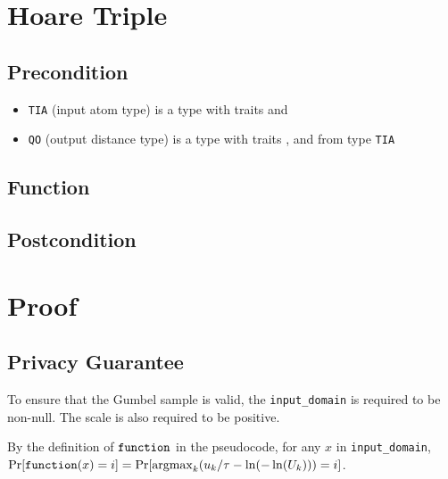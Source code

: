 \documentclass{article}
\begin{document}
\section{Hoare Triple}
\subsection*{Precondition}
\begin{itemize}
    \item \texttt{TIA} (input atom type) is a type with traits  and 

    \item \texttt{QO} (output distance type) is a type with traits , 
     and
     from type \texttt{TIA}
\end{itemize}

\subsection*{Function}
\label{sec:python-pseudocode}


\subsection*{Postcondition}


\section{Proof}
\subsection{Privacy Guarantee}

To ensure that the Gumbel sample is valid, the \texttt{input\_domain} is required to be non-null.
The scale is also required to be positive.

\begin{lemma}
    \label{function-prob}
    By the definition of $\texttt{function}$ in the pseudocode, for any $x$ in \texttt{input\_domain}, \\
    $\Pr[\texttt{function}(x) = i] = \Pr[\mathrm{argmax}_k (u_k / \tau - \ln(-\ln(U_k))) = i]$.
\end{lemma}
\end{document}
